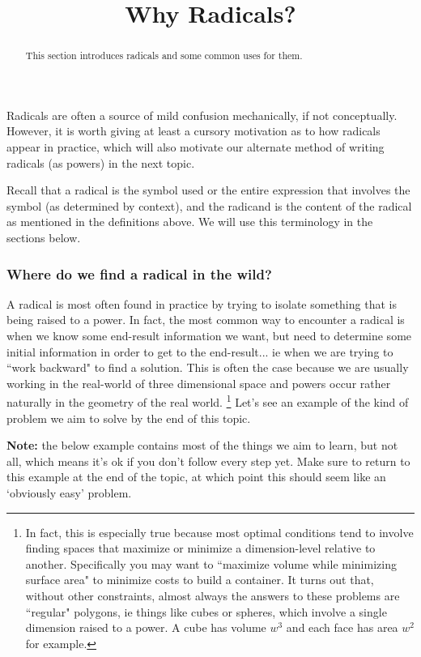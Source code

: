 \documentclass{ximeraXloud}
\title{Why Radicals?}
\begin{document}
\begin{abstract}
    This section introduces radicals and some common uses for them.
\end{abstract}
\maketitle
    Radicals are often a source of mild confusion mechanically, if not conceptually. However, it is worth giving at least a cursory motivation as to how radicals appear in practice, which will also motivate our alternate method of writing radicals (as powers) in the next topic.

    Recall that a radical is the symbol used or the entire expression that involves the symbol (as determined by context), and the radicand is the content of the radical as mentioned in the definitions above. We will use this terminology in the sections below.

    \subsubsection*{Where do we find a radical in the wild?}
        A radical is most often found in practice by trying to isolate something that is being raised to a power. In fact, the most common way to encounter a radical is when we know some end-result information we want, but need to determine some initial information in order to get to the end-result... ie when we are trying to ``work backward" to find a solution. This is often the case because we are usually working in the real-world of three dimensional space and powers occur rather naturally in the geometry of the real world.%
        \footnote{In fact, this is especially true because most optimal conditions tend to involve finding spaces that maximize or minimize a dimension-level relative to another. Specifically you may want to ``maximize volume while minimizing surface area" to minimize costs to build a container. It turns out that, without other constraints, almost always the answers to these problems are ``regular" polygons, ie things like cubes or spheres, which involve a single dimension raised to a power. A cube has volume $w^3$ and each face has area $w^2$ for example.}
        Let's see an example of the kind of problem we aim to solve by the end of this topic.

        \textbf{Note:} the below example contains most of the things we aim to learn, but not all, which means it's ok if you don't follow every step yet. Make sure to return to this example at the end of the topic, at which point this should seem like an `obviously easy' problem.
\end{document}
